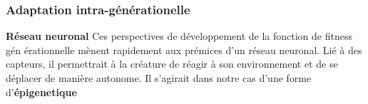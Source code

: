 \documentclass[journal, a4paper]{IEEEtran}
\begin{document}
\subsubsection{Adaptation intra-générationelle}
	\textbf{Réseau neuronal}
	Ces perspectives de développement de la fonction de fitness gén
	érationnelle
	mènent rapidement aux prémices d'un réseau neuronal.
	Lié à des capteurs, il permettrait à la créature de réagir
	à son environnement et de se déplacer de manière autonome.
	Il s'agirait dans notre cas d'une forme d'\textbf{épigenetique}
%
%
\end{document}
